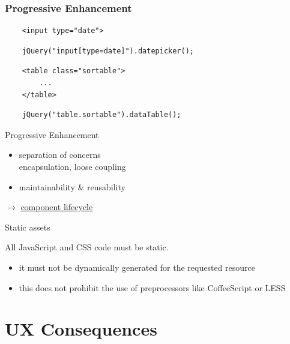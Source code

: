 \documentclass{beamer}
\begin{document}
\begin{frame}[fragile]
  \frametitle{Progressive Enhancement}

  \begin{verbatim}
    <input type="date">
  \end{verbatim}
  \begin{verbatim}
    jQuery("input[type=date]").datepicker();
  \end{verbatim}

  \vspace*{0.5cm}
  \begin{verbatim}
    <table class="sortable">
        ...
    </table>
  \end{verbatim}
  \begin{verbatim}
    jQuery("table.sortable").dataTable();
  \end{verbatim}
\end{frame}

\begin{frame}{Progressive Enhancement}
  \begin{itemize}
    \item separation of concerns \\ encapsulation, loose coupling
    \item maintainability \& reusability
  \end{itemize}

  \vspace*{0.5cm}
  \ensuremath{\rightarrow}
  \href{http://helloworld.innoq.com/workshops/javascript/part4.html\#slide-40}{component lifecycle}
\end{frame}

\begin{frame}{Static assets}

  All JavaScript and CSS code must be static.

  \begin{itemize}
    \item it must not be dynamically generated for the requested resource
    \item this does not prohibit the use of preprocessors like CoffeeScript or LESS
  \end{itemize}
\end{frame}

\section{UX Consequences}
\end{document}

